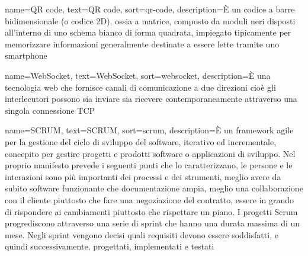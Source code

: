 {
	name={QR code},
	text=QR code,
	sort=qr-code,
	description={È un codice a barre bidimensionale (o codice 2D), ossia a matrice, composto da moduli neri disposti all'interno di uno schema bianco di forma quadrata, impiegato tipicamente per memorizzare informazioni generalmente destinate a essere lette tramite uno smartphone}
}

{
	name={WebSocket},
	text=WebSocket,
	sort=websocket,
	description={È una tecnologia web che fornisce canali di comunicazione a due direzioni cioè gli interlecutori possono sia inviare sia ricevere contemporaneamente attraverso una singola connessione TCP}
}

{
	name={SCRUM},
	text=SCRUM,
	sort=scrum,
	description={È un framework agile per la gestione del ciclo di sviluppo del software, iterativo ed incrementale, concepito per gestire progetti e prodotti software o applicazioni di sviluppo. Nel proprio manifesto prevede i seguenti punti che lo caratterizzano, le persone e le interazioni sono più importanti dei processi e dei strumenti, meglio avere da subito software funzionante che documentazione ampia, meglio una collaborazione con il cliente piuttosto che fare una negoziazione del contratto, essere in grando di rispondere ai cambiamenti piuttosto che rispettare un piano. 
	I progetti Scrum progrediscono attraverso una serie di sprint che hanno una durata massima di un mese. Negli sprint vengono decisi quali requisiti devono essere soddisfatti, e quindi successivamente, progettati, implementati e testati}
}
